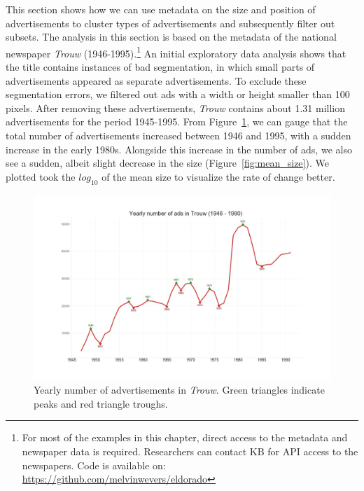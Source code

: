 \documentclass[USenglish]{article}
\begin{document}
%
This section shows how we can use metadata on the size and position of advertisements to cluster types of advertisements and subsequently filter out subsets. The analysis in this section is based on the metadata of the national newspaper \textit{Trouw} (1946-1995).\footnote{For most of the examples in this chapter, direct access to the metadata and newspaper data is required. Researchers can contact KB for API access to the newspapers. Code is available on: \url{https://github.com/melvinwevers/eldorado}} An initial exploratory data analysis shows that the title contains instances of bad segmentation, in which small parts of advertisements appeared as separate advertisements. To exclude these segmentation errors, we filtered out ads with a width or height smaller than 100 pixels. After removing these advertisements, \textit{Trouw} contains about 1.31 million advertisements for the period 1945-1995. From Figure~\ref{fig:ad_curve}, we can gauge that the total number of advertisements increased between 1946 and 1995, with a sudden increase in the early 1980s. Alongside this increase in the number of ads, we also see a sudden, albeit slight decrease in the size (Figure~\ref{fig:mean_size}). We plotted took the $log_{10}$ of the mean size to visualize the rate of change better. 

\begin{figure}%
  \centering
  \includegraphics[width=.9\textwidth]{figures/Trouw_ad_curve}%
  \caption{Yearly number of advertisements in \textit{Trouw}. Green triangles indicate peaks and red triangle troughs.}%
  \label{fig:ad_curve}%
\end{figure}
\end{document}
